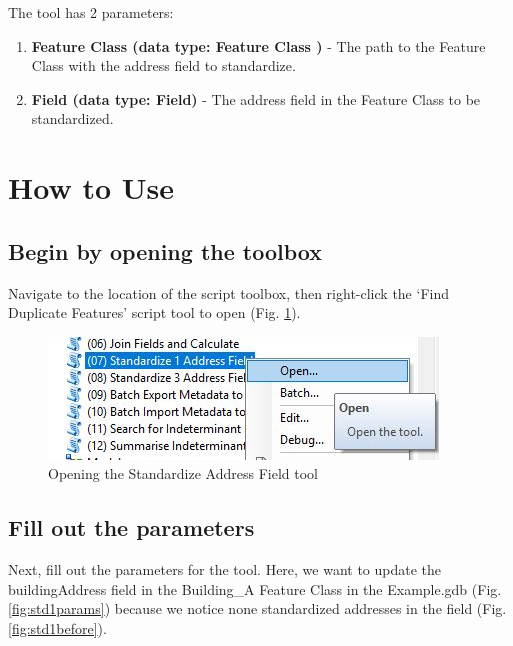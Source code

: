 \documentclass[openany]{book}
\providecommand{\tightlist}{%
  \setlength{\itemsep}{0pt}\setlength{\parskip}{0pt}}
\theoremstyle{definition}
\theoremstyle{definition}
\theoremstyle{definition}
\theoremstyle{remark}
\begin{document}
The tool has 2 parameters:

\begin{enumerate}
\def\labelenumi{\arabic{enumi}.}
\tightlist
\item
  \textbf{Feature Class (data type: Feature Class )} - The path to the
  Feature Class with the address field to standardize.
\item
  \textbf{Field (data type: Field)} - The address field in the Feature
  Class to be standardized.
\end{enumerate}

\section{How to Use}\label{how-to-use-6}

\subsection{Begin by opening the
toolbox}\label{begin-by-opening-the-toolbox-6}

Navigate to the location of the script toolbox, then right-click the
`Find Duplicate Features' script tool to open (Fig. \ref{fig:std1open}).

\begin{figure}[H]

{\centering \includegraphics{figures/std1-opentool} 

}

\caption{Opening the Standardize Address Field tool}\label{fig:std1open}
\end{figure}

\subsection{Fill out the parameters}\label{fill-out-the-parameters-6}

Next, fill out the parameters for the tool. Here, we want to update the
buildingAddress field in the Building\_A Feature Class in the
Example.gdb (Fig. \ref{fig:std1params}) because we notice none
standardized addresses in the field (Fig. \ref{fig:std1before}).
\end{document}
